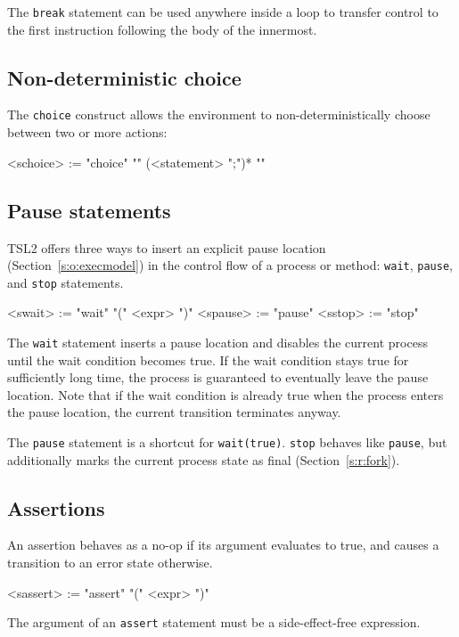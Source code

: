 \documentclass{report}
\newcommand{\src}[1]{\texttt{#1}}
\newcommand{\tsl}{TSL2 }
\begin{document}
The \src{break} statement can be used anywhere inside a loop to 
transfer control to the first instruction following the body of 
the innermost.

\subsection{Non-deterministic choice}  The \src{choice} construct 
allows the environment to non-deterministically choose between
two or more actions:
\begin{bnflisting}{}
<schoice> := "choice" "{"
               (<statement> ";")*
             "}"
\end{bnflisting}

\subsection{Pause statements}\label{s:r:pause}

\tsl offers three ways to insert an explicit pause location 
(Section~\ref{s:o:execmodel}) in the control flow of a process or 
method: \src{wait}, \src{pause}, and \src{stop}
statements.
\begin{bnflisting}{}
<swait>  := "wait" "(" <expr> ")"
<spause> := "pause"
<sstop>  := "stop"
\end{bnflisting}

The \src{wait} statement inserts a pause location and disables the 
current process until the wait condition becomes true.  If the 
wait condition stays true for sufficiently long time, the process 
is guaranteed to eventually leave the pause location.  Note that 
if the wait condition is already true when the process enters the 
pause location, the current transition terminates anyway.

The \src{pause} statement is a shortcut for \src{wait(true)}.  
\src{stop} behaves like \src{pause}, but additionally marks the 
current process state as final (Section~\ref{s:r:fork}).

\subsection{Assertions} 

An assertion behaves as a no-op if its argument evaluates to true, 
and causes a transition to an error
state otherwise.
\begin{bnflisting}{}
<sassert> := "assert" "(" <expr> ")"
\end{bnflisting}
The argument of an \src{assert} statement must be a 
side-effect-free expression.
\end{document}
